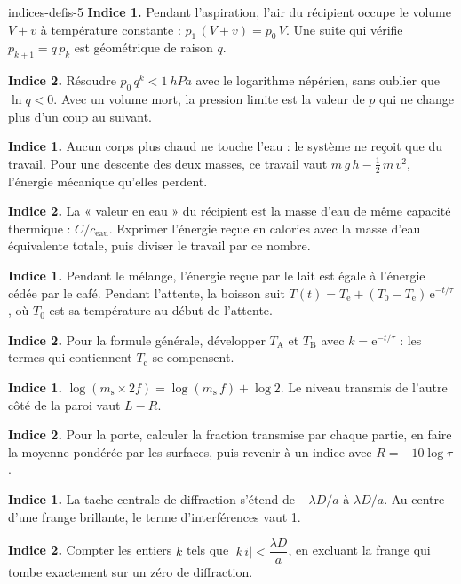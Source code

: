 \begin{blocEdition}{indices-defis-5}
\textbf{Indice 1.} Pendant l'aspiration, l'air du récipient occupe le volume $V+v$ à température constante :
$p_1\,(V+v)=p_0\,V$. Une suite qui vérifie $p_{k+1}=q\,p_k$ est géométrique de raison $q$.\par\smallskip
\textbf{Indice 2.} Résoudre $p_0\,q^k<\qty{1}{hPa}$ avec le logarithme népérien, sans oublier que $\ln q<0$. Avec un volume
mort, la pression limite est la valeur de $p$ qui ne change plus d'un coup au suivant.\par\smallskip
{}
\textbf{Indice 1.} Aucun corps plus chaud ne touche l'eau : le système ne reçoit que du travail. Pour une descente des deux
masses, ce travail vaut $m\,g\,h-\frac12\,m\,v^2$, l'énergie mécanique qu'elles perdent.\par\smallskip
\textbf{Indice 2.} La « valeur en eau » du récipient est la masse d'eau de même capacité thermique : $C/c_\mathrm{eau}$.
Exprimer l'énergie reçue en calories avec la masse d'eau équivalente totale, puis diviser le travail par ce nombre.\par\smallskip
{}
\textbf{Indice 1.} Pendant le mélange, l'énergie reçue par le lait est égale à l'énergie cédée par le café. Pendant l'attente,
la boisson suit $T(t)=T_\mathrm{e}+(T_0-T_\mathrm{e})\,\mathrm{e}^{-t/\tau}$, où $T_0$ est sa température au début de l'attente.\par\smallskip
\textbf{Indice 2.} Pour la formule générale, développer $T_\mathrm{A}$ et $T_\mathrm{B}$ avec $k=\mathrm{e}^{-t/\tau}$ : les termes qui
contiennent $T_\mathrm{c}$ se compensent.\par\smallskip
{}
\textbf{Indice 1.} $\log(m_\mathrm{s}\times2f)=\log(m_\mathrm{s}\,f)+\log2$. Le niveau transmis de l'autre côté de la paroi vaut
$L-R$.\par\smallskip
\textbf{Indice 2.} Pour la porte, calculer la fraction transmise par chaque partie, en faire la moyenne pondérée par les
surfaces, puis revenir à un indice avec $R=-10\log\tau$.\par\smallskip
{}
\textbf{Indice 1.} La tache centrale de diffraction s'étend de $-\lambda D/a$ à $\lambda D/a$. Au centre d'une frange brillante, le
terme d'interférences vaut 1.\par\smallskip
\textbf{Indice 2.} Compter les entiers $k$ tels que $|k\,i|<\dfrac{\lambda D}{a}$, en excluant la frange qui tombe exactement sur un
zéro de diffraction.\par\smallskip
\end{blocEdition}

